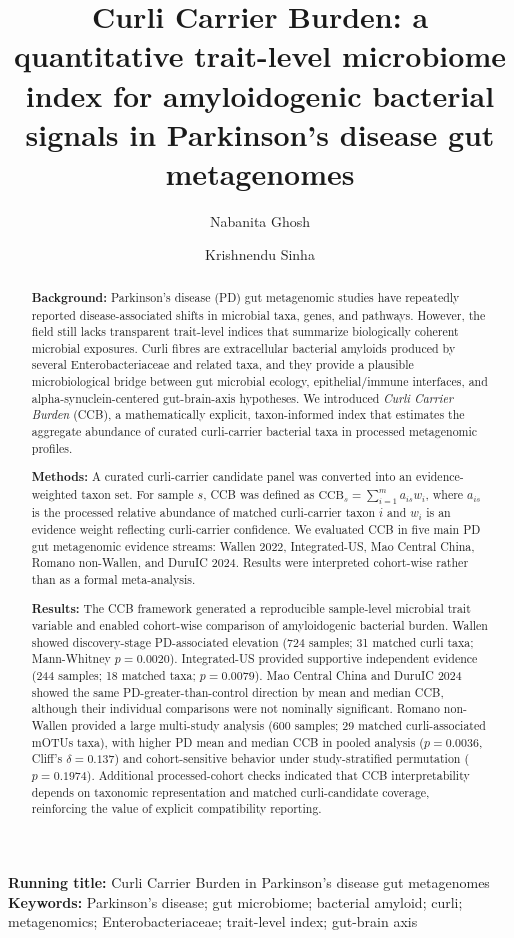 \documentclass[11pt]{article}
\title{Curli Carrier Burden: a quantitative trait-level microbiome index for amyloidogenic bacterial signals in Parkinson's disease gut metagenomes}
\author[1,*]{Nabanita Ghosh}
\author[2]{Krishnendu Sinha}
\affil[1]{Department of Zoology, Maulana Azad College, Kolkata, India}
\affil[2]{Department of Zoology, Jhargram Raj College, Jhargram, India}
\affil[*]{Corresponding author: Nabanita Ghosh; Email: nabanitaghosh89@gmail.com}
\date{}
\newcommand{\CCB}{\mathrm{CCB}}
\begin{document}
\maketitle

\textbf{Running title:} Curli Carrier Burden in Parkinson's disease gut metagenomes\\
\textbf{Keywords:} Parkinson's disease; gut microbiome; bacterial amyloid; curli; metagenomics; Enterobacteriaceae; trait-level index; gut-brain axis

\begin{abstract}
\textbf{Background:} Parkinson's disease (PD) gut metagenomic studies have repeatedly reported disease-associated shifts in microbial taxa, genes, and pathways. However, the field still lacks transparent trait-level indices that summarize biologically coherent microbial exposures. Curli fibres are extracellular bacterial amyloids produced by several Enterobacteriaceae and related taxa, and they provide a plausible microbiological bridge between gut microbial ecology, epithelial/immune interfaces, and alpha-synuclein-centered gut-brain-axis hypotheses. We introduced \emph{Curli Carrier Burden} (CCB), a mathematically explicit, taxon-informed index that estimates the aggregate abundance of curated curli-carrier bacterial taxa in processed metagenomic profiles.

\textbf{Methods:} A curated curli-carrier candidate panel was converted into an evidence-weighted taxon set. For sample $s$, CCB was defined as $\CCB_s=\sum_{i=1}^{m} a_{is}w_i$, where $a_{is}$ is the processed relative abundance of matched curli-carrier taxon $i$ and $w_i$ is an evidence weight reflecting curli-carrier confidence. We evaluated CCB in five main PD gut metagenomic evidence streams: Wallen 2022, Integrated-US, Mao Central China, Romano non-Wallen, and DuruIC 2024. Results were interpreted cohort-wise rather than as a formal meta-analysis.

\textbf{Results:} The CCB framework generated a reproducible sample-level microbial trait variable and enabled cohort-wise comparison of amyloidogenic bacterial burden. Wallen showed discovery-stage PD-associated elevation (724 samples; 31 matched curli taxa; Mann-Whitney $p=0.0020$). Integrated-US provided supportive independent evidence (244 samples; 18 matched taxa; $p=0.0079$). Mao Central China and DuruIC 2024 showed the same PD-greater-than-control direction by mean and median CCB, although their individual comparisons were not nominally significant. Romano non-Wallen provided a large multi-study analysis (600 samples; 29 matched curli-associated mOTUs taxa), with higher PD mean and median CCB in pooled analysis ($p=0.0036$, Cliff's $\delta=0.137$) and cohort-sensitive behavior under study-stratified permutation ($p=0.1974$). Additional processed-cohort checks indicated that CCB interpretability depends on taxonomic representation and matched curli-candidate coverage, reinforcing the value of explicit compatibility reporting.


\end{abstract}
\end{document}
